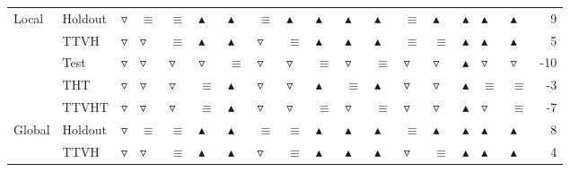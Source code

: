 \begin{table}
\begin{tabular}{lllllllllllllllllr}
Local & Holdout &  $\triangledown$ &          $\equiv$ &          $\equiv$ &  $\blacktriangle$ &  $\blacktriangle$ &          $\equiv$ &  $\blacktriangle$ &  $\blacktriangle$ &  $\blacktriangle$ &  $\blacktriangle$ &          $\equiv$ &  $\blacktriangle$ &  $\blacktriangle$ &  $\blacktriangle$ &  $\blacktriangle$ &                9 \\
       & TTVH &  $\triangledown$ &   $\triangledown$ &          $\equiv$ &  $\blacktriangle$ &  $\blacktriangle$ &   $\triangledown$ &          $\equiv$ &  $\blacktriangle$ &  $\blacktriangle$ &  $\blacktriangle$ &          $\equiv$ &          $\equiv$ &  $\blacktriangle$ &  $\blacktriangle$ &  $\blacktriangle$ &                5 \\
       & Test &  $\triangledown$ &   $\triangledown$ &   $\triangledown$ &   $\triangledown$ &          $\equiv$ &   $\triangledown$ &   $\triangledown$ &          $\equiv$ &   $\triangledown$ &          $\equiv$ &   $\triangledown$ &   $\triangledown$ &  $\blacktriangle$ &   $\triangledown$ &   $\triangledown$ &              -10 \\
       & THT &  $\triangledown$ &   $\triangledown$ &   $\triangledown$ &          $\equiv$ &  $\blacktriangle$ &   $\triangledown$ &   $\triangledown$ &  $\blacktriangle$ &          $\equiv$ &  $\blacktriangle$ &   $\triangledown$ &   $\triangledown$ &  $\blacktriangle$ &          $\equiv$ &          $\equiv$ &               -3 \\
       & TTVHT &  $\triangledown$ &   $\triangledown$ &   $\triangledown$ &          $\equiv$ &  $\blacktriangle$ &   $\triangledown$ &   $\triangledown$ &          $\equiv$ &   $\triangledown$ &          $\equiv$ &   $\triangledown$ &   $\triangledown$ &  $\blacktriangle$ &   $\triangledown$ &          $\equiv$ &               -7 \\
Global & Holdout &  $\triangledown$ &          $\equiv$ &          $\equiv$ &  $\blacktriangle$ &  $\blacktriangle$ &          $\equiv$ &          $\equiv$ &  $\blacktriangle$ &  $\blacktriangle$ &  $\blacktriangle$ &          $\equiv$ &  $\blacktriangle$ &  $\blacktriangle$ &  $\blacktriangle$ &  $\blacktriangle$ &                8 \\
       & TTVH &  $\triangledown$ &   $\triangledown$ &          $\equiv$ &  $\blacktriangle$ &  $\blacktriangle$ &   $\triangledown$ &          $\equiv$ &  $\blacktriangle$ &  $\blacktriangle$ &  $\blacktriangle$ &   $\triangledown$ &          $\equiv$ &  $\blacktriangle$ &  $\blacktriangle$ &  $\blacktriangle$ &                4 \\

\end{tabular}
\end{table}
